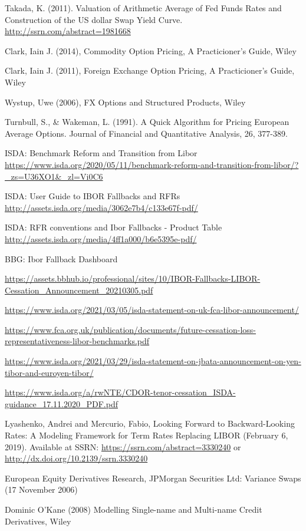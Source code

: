 \begin{thebibliography}{*}
 Takada, K. (2011). Valuation of Arithmetic Average of Fed Funds Rates and Construction of the US dollar Swap Yield Curve. \url{http://ssrn.com/abstract=1981668}

 Clark, Iain J. (2014), Commodity Option Pricing, A Practicioner's Guide, Wiley

 Clark, Iain J. (2011), Foreign Exchange Option Pricing, A Practicioner's Guide, Wiley

 Wystup, Uwe (2006), FX Options and Structured Products, Wiley
 
 Turnbull, S., \& Wakeman, L. (1991). A Quick Algorithm for Pricing European Average
  Options. Journal of Financial and Quantitative Analysis, 26, 377-389.

 ISDA: Benchmark Reform and Transition from Libor \url{https://www.isda.org/2020/05/11/benchmark-reform-and-transition-from-libor/?_zs=U36XO1&_zl=Vi0C6}

 ISDA: User Guide to IBOR Fallbacks and RFRs \url{http://assets.isda.org/media/3062e7b4/c133e67f-pdf/}

 ISDA: RFR conventions and Ibor Fallbacks - Product Table \url{http://assets.isda.org/media/4ff1a000/b6e5395e-pdf/}

 BBG: Ibor Fallback Dashboard

 \url{https://assets.bbhub.io/professional/sites/10/IBOR-Fallbacks-LIBOR-Cessation_Announcement_20210305.pdf}

 \url{https://www.isda.org/2021/03/05/isda-statement-on-uk-fca-libor-announcement/}

 \url{https://www.fca.org.uk/publication/documents/future-cessation-loss-representativeness-libor-benchmarks.pdf}

 \url{https://www.isda.org/2021/03/29/isda-statement-on-jbata-announcement-on-yen-tibor-and-euroyen-tibor/}

 \url{https://www.isda.org/a/rwNTE/CDOR-tenor-cessation_ISDA-guidance_17.11.2020_PDF.pdf}

 Lyashenko, Andrei and Mercurio, Fabio, Looking Forward to Backward-Looking Rates: A Modeling Framework for Term Rates Replacing LIBOR (February 6, 2019). Available at SSRN: \url{https://ssrn.com/abstract=3330240} or \url{http://dx.doi.org/10.2139/ssrn.3330240}

 European Equity Derivatives Research, JPMorgan Securities Ltd: Variance Swaps (17 November 2006)
  
 Dominic O'Kane (2008) Modelling Single-name and Multi-name Credit Derivatives, Wiley

\end{thebibliography}
